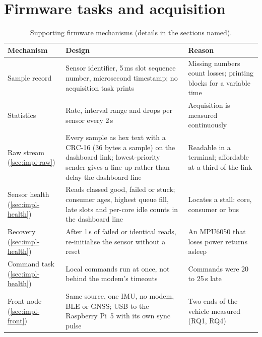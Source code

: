 \section{Firmware tasks and acquisition}
\label{sec:impl-fw}

\begin{table}[htbp]
\centering
\small
\caption[Supporting firmware mechanisms (details in the sections named)]{Supporting firmware mechanisms (details in the sections named).}
\label{tab:fw-mechanisms}
\begin{tabular}{|p{2.6cm}|p{7.4cm}|p{4.2cm}|}
\hline
\textbf{Mechanism} & \textbf{Design} & \textbf{Reason} \\ \hline
Sample record & Sensor identifier, 5\,ms slot sequence number, microsecond timestamp; no acquisition task prints & Missing numbers count losses; printing blocks for a variable time \\ \hline
Statistics & Rate, interval range and drops per sensor every 2\,s & Acquisition is measured continuously \\ \hline
Raw stream (\ref{sec:impl-raw}) & Every sample as hex text with a CRC-16 (36 bytes a sample) on the dashboard link; lowest-priority sender gives a line up rather than delay the dashboard line & Readable in a terminal; affordable at a third of the link \\ \hline
Sensor health (\ref{sec:impl-health}) & Reads classed good, failed or stuck; consumer ages, highest queue fill, late slots and per-core idle counts in the dashboard line & Locates a stall: core, consumer or bus \\ \hline
Recovery (\ref{sec:impl-health}) & After 1\,s of failed or identical reads, re-initialise the sensor without a reset & An MPU6050 that loses power returns asleep \\ \hline
Command task (\ref{sec:impl-health}) & Local commands run at once, not behind the modem's timeouts & Commands were 20 to 25\,s late \\ \hline
Front node (\ref{sec:impl-front}) & Same source, one IMU, no modem, BLE or GNSS; USB to the Raspberry Pi~5 with its own sync pulse & Two ends of the vehicle measured (RQ1, RQ4) \\ \hline
\end{tabular}
\end{table}

